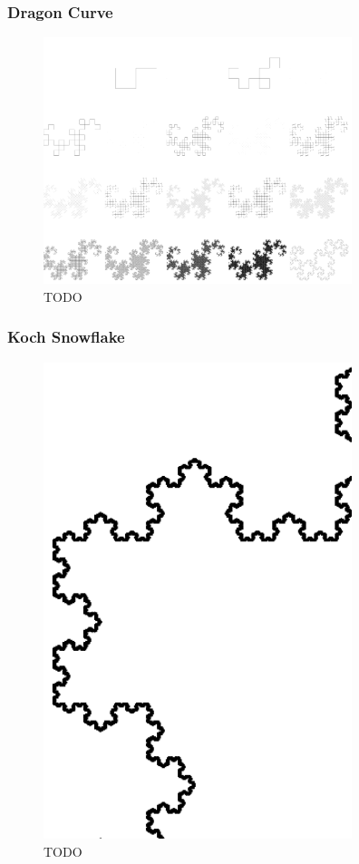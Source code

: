 \documentclass[11pt]{article}
\begin{document}
\subsubsection{Dragon Curve}
\label{sec:org040d758}

\begin{figure}[htbp]
\centering
\includegraphics[width=9cm]{../Problems/Chaos/Spirals/dragon.png}
\caption{\label{dragon-turtle}TODO}
\end{figure}



\subsubsection{Koch Snowflake}
\label{sec:org9312b62}
\begin{figure}[htbp]
\centering
\includegraphics[width=9cm]{../Problems/Chaos/Spirals/snowCurve.png}
\caption{\label{dragon-turtle}TODO}
\end{figure}
\end{document}
